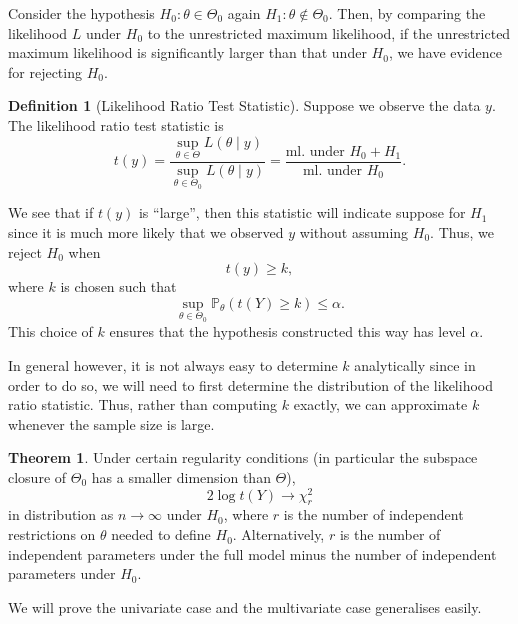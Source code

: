 \documentclass[
]{article}
\theoremstyle{definition}
\newtheorem{theorem}{Theorem}
\theoremstyle{definition}
\newtheorem{definition}{Definition}[section]
\begin{document}
Consider the hypothesis \(H_0 : \theta \in \Theta_0\) again
\(H_1 : \theta \not\in \Theta_0\). Then, by comparing the likelihood
\(L\) under \(H_0\) to the unrestricted maximum likelihood, if the
unrestricted maximum likelihood is significantly larger than that under
\(H_0\), we have evidence for rejecting \(H_0\).

\begin{definition}[Likelihood Ratio Test Statistic]
  Suppose we observe the data \(y\). The likelihood ratio test statistic is 
  \[t(y) = \frac{\sup_{\theta \in \Theta} L(\theta \mid y)}
    {\sup_{\theta \in \Theta_0} L(\theta \mid y)} = 
    \frac{\text{ml. under } H_0 + H_1}{\text{ml. under } H_0}.\]
\end{definition}

We see that if \(t(y)\) is ``large'', then this statistic will indicate
suppose for \(H_1\) since it is much more likely that we observed \(y\)
without assuming \(H_0\). Thus, we reject \(H_0\) when \[t(y) \ge k,\]
where \(k\) is chosen such that
\[\sup_{\theta \in \Theta_0} \mathbb{P}_\theta(t(Y) \ge k) \le \alpha.\]
This choice of \(k\) ensures that the hypothesis constructed this way
has level \(\alpha\).

In general however, it is not always easy to determine \(k\)
analytically since in order to do so, we will need to first determine
the distribution of the likelihood ratio statistic. Thus, rather than
computing \(k\) exactly, we can approximate \(k\) whenever the sample
size is large.

\begin{theorem}
  Under certain regularity conditions (in particular the subspace closure 
  of \(\Theta_0\) has a smaller dimension than \(\Theta\)), 
  \[2\log t(Y) \to \chi_r^2\]
  in distribution as \(n \to \infty\) under \(H_0\), where 
  \(r\) is the number of independent restrictions on \(\theta\) needed to 
  define \(H_0\). Alternatively, \(r\) is the number of independent parameters 
  under the full model minus the number of independent parameters under \(H_0\).
\end{theorem}
\proof

We will prove the univariate case and the multivariate case generalises
easily.
\end{document}
